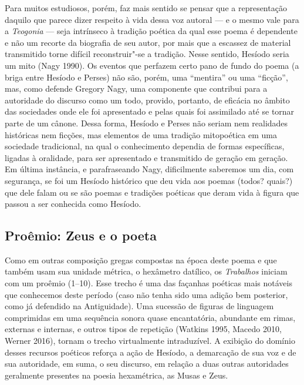 Para muitos estudiosos, porém, faz mais sentido se pensar que a
representação daquilo que parece dizer respeito à vida dessa voz autoral
--- e o mesmo vale para a \emph{Teogonia} --- seja intrínseco à tradição
poética da qual esse poema é dependente e não um recorte da biografia de
seu autor, por mais que a escassez de material transmitido torne difícil
reconstruir"-se a tradição. Nesse sentido, Hesíodo seria um mito (Nagy
1990). Os eventos que perfazem certo pano de fundo do poema (a briga
entre Hesíodo e Perses) não são, porém, uma ``mentira'' ou uma
``ficção'', mas, como defende Gregory Nagy, uma componente que contribui
para a autoridade do discurso como um todo, provido, portanto, de
eficácia no âmbito das sociedades onde ele foi apresentado e pelas quais
foi assimilado até se tornar parte de um cânone. Dessa forma, Hesíodo e
Perses não seriam nem realidades históricas nem ficções, mas elementos
de uma tradição mitopoética em uma sociedade tradicional, na qual o
conhecimento dependia de formas específicas, ligadas à oralidade, para
ser apresentado e transmitido de geração em geração. Em última
instância, e parafraseando Nagy, dificilmente saberemos um dia, com
segurança, se foi um Hesíodo histórico que deu vida aos poemas (todos?
quais?) que dele falam ou se são poemas e tradições poéticas que deram
vida à figura que passou a ser conhecida como Hesíodo.



\subsection{Proêmio: Zeus e o poeta}

Como em outras composição gregas compostas na época deste poema e que
também usam sua unidade métrica, o hexâmetro datílico, os
\emph{Trabalhos} iniciam com um proêmio (1--10). Esse trecho é uma das
façanhas poéticas mais notáveis que conhecemos deste período (caso não
tenha sido uma adição bem posterior, como já defendido na Antiguidade).
Uma sucessão de figuras de linguagem comprimidas em uma sequência sonora
quase encantatória, abundante em rimas, externas e internas, e outros
tipos de repetição (Watkins 1995, Macedo 2010, Werner 2016), tornam o
trecho virtualmente intraduzível. A exibição do domínio desses recursos
poéticos reforça a ação de Hesíodo, a demarcação de sua voz e de sua
autoridade, em suma, o seu discurso, em relação a duas outras
autoridades geralmente presentes na poesia hexamétrica, as Musas e Zeus.

